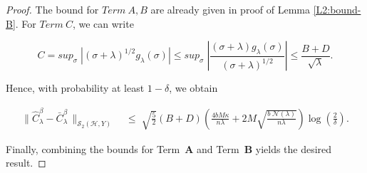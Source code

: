 \documentclass[10pt,a4paper]{amsart}
\begin{document}
\begin{proof}
\noindent
The bound for $Term~A,B$ are already given in proof of Lemma \ref{L2:bound-B}. For $Term~C$, we can write

\[
C = {sup}_\sigma \; | (\sigma +\lambda)^{1/2} g_\lambda(\sigma)| \leq {sup}_\sigma \; \left| \frac{ (\sigma +\lambda) g_\lambda(\sigma)}{(\sigma +\lambda)^{1/2}}\right| \leq \frac{B+D}{\sqrt{\lambda}}.   \]

\noindent
Hence, with probability at least $1-\delta$, we obtain

\begin{align*}
\bigl\|  \widehat{C}_\lambda^\beta-\bar{C}_{\lambda}^\beta\,  \bigr\|_{\mathcal  S_2(\mathcal H,Y)}
\;&\leq\;
\sqrt{\frac{5}{2}}(B+D)\left(
\frac{4bM\kappa}{n{\lambda}}
+ 2
M\sqrt{
\frac{b \; \mathcal{N}(\lambda)}{n\lambda}
}
\right)\log\!\left( \frac{2}{\delta} \right)
.
\end{align*}

\noindent
Finally, combining the bounds for Term~\textbf{A} and Term~\textbf{B} yields the desired result.

\end{proof}
\end{document}
